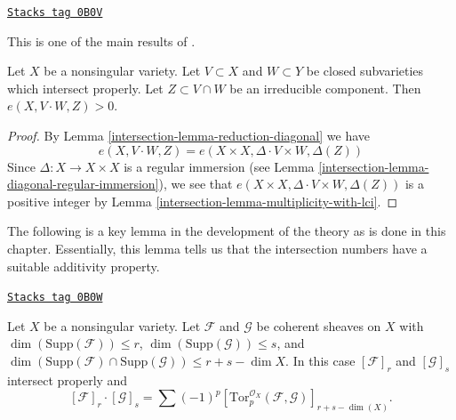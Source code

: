 \begin{proposition}[Positivity]
\label{intersection-proposition-positivity}
\href{https://stacks.math.columbia.edu/tag/0B0V}{\texttt{Stacks tag 0B0V}}

\begin{reference}
This is one of the main results of \cite{Serre_algebre_locale}.
\end{reference}
Let $X$ be a nonsingular variety. Let $V \subset X$ and
$W \subset Y$ be closed subvarieties which intersect properly.
Let $Z \subset V \cap W$ be an irreducible component.
Then $e(X, V \cdot W, Z) > 0$.
\end{proposition}

\begin{proof}

By Lemma \ref{intersection-lemma-reduction-diagonal} we have
$$
e(X, V \cdot W, Z) = e(X \times X, \Delta \cdot V \times W, \Delta(Z))
$$
Since $\Delta : X \to X \times X$ is a regular immersion
(see Lemma \ref{intersection-lemma-diagonal-regular-immersion}), we see that
$e(X \times X, \Delta \cdot V \times W, \Delta(Z))$ is a positive
integer by Lemma \ref{intersection-lemma-multiplicity-with-lci}.
\end{proof}

The following is a key lemma in the development of the theory as
is done in this chapter. Essentially, this lemma tells us that
the intersection numbers have a suitable additivity property.

\begin{lemma}
\label{intersection-lemma-tor-sheaf}
\href{https://stacks.math.columbia.edu/tag/0B0W}{\texttt{Stacks tag 0B0W}}

\begin{reference}
\cite[Chapter V]{Serre_algebre_locale}
\end{reference}
Let $X$ be a nonsingular variety. Let $\mathcal{F}$ and
$\mathcal{G}$ be coherent sheaves on $X$ with
$\dim(\text{Supp}(\mathcal{F})) \leq r$,
$\dim(\text{Supp}(\mathcal{G})) \leq s$, and
$\dim(\text{Supp}(\mathcal{F}) \cap \text{Supp}(\mathcal{G}) )
\leq r + s - \dim X$. In this case $[\mathcal{F}]_r$ and $[\mathcal{G}]_s$
intersect properly and
$$
[\mathcal{F}]_r \cdot [\mathcal{G}]_s =
\sum (-1)^p
[\text{Tor}_p^{\mathcal{O}_X}(\mathcal{F}, \mathcal{G})]_{r + s - \dim(X)}.
$$
\end{lemma}


